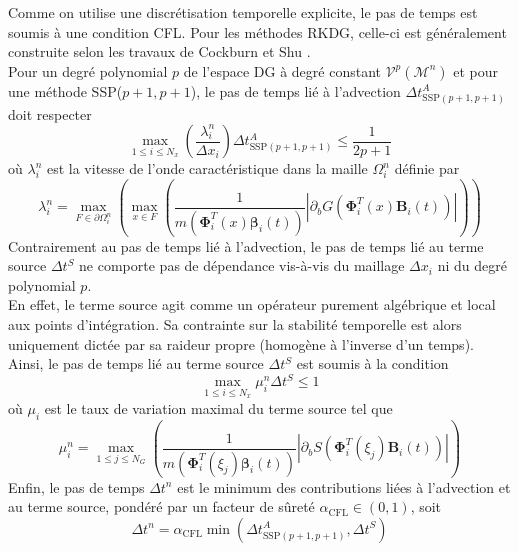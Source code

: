 \documentclass[11pt, a4paper, oneside]{report}
\begin{document}
Comme on utilise une discrétisation temporelle explicite, le pas de temps est soumis à une condition CFL. Pour les méthodes RKDG, celle-ci est généralement construite selon les travaux de Cockburn et Shu \cite{cockburn2001runge}. \\
Pour un degré polynomial $p$ de l'espace DG à degré constant $\mathcal{V}^p(\mathcal{M}^n)$ et pour une méthode SSP($p+1, p+1$), le pas de temps lié à l'advection $\displaystyle \Delta t_{\text{SSP}(p+1, p+1)}^A$ doit respecter
\begin{equation}
    \max_{1 \leq i \leq N_x} \left( \frac{\lambda_i^n}{\Delta x_i} \right) \Delta t_{\text{SSP}(p+1, p+1)}^A \leq \frac{1}{2p+1}
\end{equation}
où $\lambda_i^n$ est la vitesse de l'onde caractéristique dans la maille $\Omega_i^n$ définie par
\begin{equation} \label{eq:Vitesse_onde_sedimentaire}
    \lambda_i^n = \max_{F \in \partial \Omega_i^n} \left( \max_{x \in F} \left(  \frac{1}{m \left( \bm{\Phi}_i^T(x) \bm{\beta}_i(t) \right)} \left| \partial_b G \left( \bm{\Phi}_i^T(x) \bm{B}_i(t) \right) \right| \right) \right)
\end{equation}
Contrairement au pas de temps lié à l'advection, le pas de temps lié au terme source $\Delta t^S$ ne comporte pas de dépendance vis-à-vis du maillage $\Delta x_i$ ni du degré polynomial $p$. \\
En effet, le terme source agit comme un opérateur purement algébrique et local aux points d'intégration. Sa contrainte sur la stabilité temporelle est alors uniquement dictée par sa raideur propre (homogène à l'inverse d'un temps). \\
Ainsi, le pas de temps lié au terme source $\Delta t^S$ est soumis à la condition
\begin{equation} \label{eq:Pas_de_temps_source_Exner}
    \max_{1 \leq i \leq N_x} \mu_i^n \Delta t^S \leq 1
\end{equation}
où $\mu_i$ est le taux de variation maximal du terme source tel que
\begin{equation} \label{eq:Raideur_propre_source_Exner}
    \mu_i^n = \max_{1 \leq j \leq N_G} \left( \frac{1}{m \left( \bm{\Phi}_i^T(\xi_j) \bm{\beta}_i(t) \right)} \left| \partial_b S \left( \bm{\Phi}_i^T(\xi_j) \bm{B}_i(t) \right) \right| \right)
\end{equation}
Enfin, le pas de temps $\Delta t^n$ est le minimum des contributions liées à l'advection et au terme source, pondéré par un facteur de sûreté $\alpha_\text{CFL} \in (0, 1)$, soit
\begin{equation} \label{eq:Pas_de_temps_Exner}
    \Delta t^n = \alpha_\text{CFL} \min \left( \Delta t_{\text{SSP}(p+1, p+1)}^A, \Delta t^S \right)
\end{equation}
\end{document}
